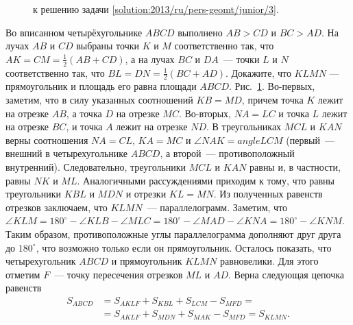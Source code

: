 \ifsolution
\begin{figure}\centering
    \caption{к решению задачи \ref{solution:2013/ru/pers-geomt/junior/3}.}
    \label{fig:solution:2013/ru/pers-geomt/junior/3}
\end{figure}%
\fi %

\problem
Во вписанном четырёхугольнике $ABCD$ выполнено $AB > CD$ и $BC > AD$.
На лучах $AB$ и $CD$ выбраны точки $K$ и $M$ соответственно так, что
$AK = CM = \frac{1}{2} (AB + CD)$,
а на лучах $BC$ и $DA$~--- точки $L$ и $N$ соответственно так, что
$BL = DN = \frac{1}{2} (BC + AD)$.
Докажите, что $KLMN$ --- прямоугольник и 
площадь его равна площади $ABCD$.
\solution 
\label{solution:2013/ru/pers-geomt/junior/3}
Рис.~\ref{fig:solution:2013/ru/pers-geomt/junior/3}.
Во-первых, заметим, что в силу указанных соотношений $KB = MD$, причем точка
$K$ лежит на отрезке $AB$, а точка $D$ на отрезке $MC$.
Во-вторых, $NA = LC$ и точка $L$ лежит на отрезке $BC$, и точка $A$ лежит на
отрезке $ND$.
В треугольниках $MCL$ и $KAN$ верны соотношения $NA = CL$, $KA = MC$ и
$\angle NAK = angle LCM$ (первый~--- внешний в четырехугольнике $ABCD$, а
второй~--- противоположный внутренний).
Следовательно, треугольники $MCL$ и $KAN$ равны и, в частности, равны $NK$ и
$ML$.
Аналогичными рассуждениями приходим к тому, что равны треугольники $KBL$ и
$MDN$ и отрезки $KL = MN$.
Из полученных равенств отрезков заключаем, что $KLMN$~--- параллелограмм.
Заметим, что
\(
    \angle KLM
=
    180^\circ - \angle KLB - \angle MLC
=
    180^\circ - \angle MAD - \angle KNA
=
    180^\circ - \angle KNM
\).
Таким образом, противоположные углы параллелограмма дополняют друг друга до
$180^\circ$, что возможно только если он прямоугольник.
Осталось показать, что четырехугольник $ABCD$ и прямоугольник $KLMN$
равновелики.
Для этого отметим $F$~--- точку пересечения отрезков $ML$ и $AD$.
Верна следующая цепочка равенств
\begin{align*}
    S_{ABCD}
&{}=
    S_{AKLF} + S_{KBL} + S_{LCM} - S_{MFD}
=\\&{}=
    S_{AKLF} + S_{MDN} + S_{MAK} - S_{MFD}
=
    S_{KLMN}.
\end{align*}
\endproblem
